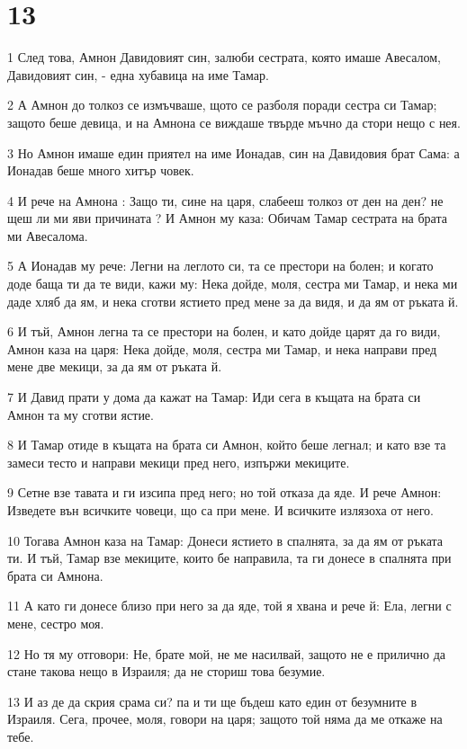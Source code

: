 \chapter{13}

\par 1 След това, Амнон Давидовият син, залюби сестрата, която имаше Авесалом, Давидовият син, - една хубавица на име Тамар.
\par 2 А Амнон до толкоз се измъчваше, щото се разболя поради сестра си Тамар; защото беше девица, и на Амнона се виждаше твърде мъчно да стори нещо с нея.
\par 3 Но Амнон имаше един приятел на име Ионадав, син на Давидовия брат Сама: а Ионадав беше много хитър човек.
\par 4 И рече на Амнона : Защо ти, сине на царя, слабееш толкоз от ден на ден? не щеш ли ми яви причината ? И Амнон му каза: Обичам Тамар сестрата на брата ми Авесалома.
\par 5 А Ионадав му рече: Легни на леглото си, та се престори на болен; и когато доде баща ти да те види, кажи му: Нека дойде, моля, сестра ми Тамар, и нека ми даде хляб да ям, и нека сготви ястието пред мене за да видя, и да ям от ръката й.
\par 6 И тъй, Амнон легна та се престори на болен, и като дойде царят да го види, Амнон каза на царя: Нека дойде, моля, сестра ми Тамар, и нека направи пред мене две мекици, за да ям от ръката й.
\par 7 И Давид прати у дома да кажат на Тамар: Иди сега в къщата на брата си Амнон та му сготви ястие.
\par 8 И Тамар отиде в къщата на брата си Амнон, който беше легнал; и като взе та замеси тесто и направи мекици пред него, изпържи мекиците.
\par 9 Сетне взе тавата и ги изсипа пред него; но той отказа да яде. И рече Амнон: Изведете вън всичките човеци, що са при мене. И всичките излязоха от него.
\par 10 Тогава Амнон каза на Тамар: Донеси ястието в спалнята, за да ям от ръката ти. И тъй, Тамар взе мекиците, които бе направила, та ги донесе в спалнята при брата си Амнона.
\par 11 А като ги донесе близо при него за да яде, той я хвана и рече й: Ела, легни с мене, сестро моя.
\par 12 Но тя му отговори: Не, брате мой, не ме насилвай, защото не е прилично да стане такова нещо в Израиля; да не сториш това безумие.
\par 13 И аз де да скрия срама си? па и ти ще бъдеш като един от безумните в Израиля. Сега, прочее, моля, говори на царя; защото той няма да ме откаже на тебе.
